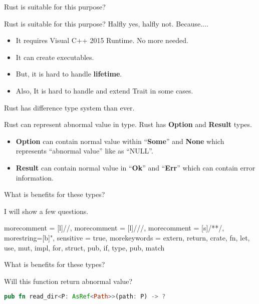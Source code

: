 \documentclass[12pt, unicode]{beamer}
\begin{document}
\begin{frame}{Rust is suitable for this purpose?}
\begin{block}{Rust is suitable for this purpose?}
Halfly yes, halfly not. Because....
\end{block}
\begin{itemize}
\item<2-> It requires Visual C++ 2015 Runtime. No more needed.
\item<3-> It can create executables.
\item<4-> But, it is hard to handle \textbf {lifetime}.
\item<5-> Also, It is hard to handle and extend Trait in some cases.
\end{itemize}
\end{frame}

\begin{frame}{Rust has difference type system than ever.}
\begin{block}{Rust can represent abnormal value in type.}
Rust has \textbf {Option} and \textbf{Result} types.
\end{block}
\begin{itemize}
\item<2-> \textbf {Option} can contain normal value within ``\textbf{Some}'' and \textbf{None} which represents ``abnormal value'' like as ``NULL''.
\item<3-> \textbf {Result} can contain normal value in ``\textbf{Ok}'' and ``\textbf{Err}'' which can contain error information.
\end{itemize}
\end{frame}

\begin{frame}{What is benefits for these types?}
  \begin{block}{}
    I will show a few questions.
  \end{block}
\end{frame}

\newcommand\Small{\fontsize{9}{9.2}\selectfont}
 {
  morecomment = [l]{//},
  morecomment = [l]{///},
  morecomment = [s]{/*}{*/},
  morestring=[b]",
  sensitive = true,
  morekeywords = {extern, return, crate, fn, let, use, mut, impl, for, struct, pub, if, type, pub, match}
}
\begin{frame}[fragile]{What is benefits for these types?}
  \begin{block}{}
    Will this function return abnormal value?
  \end{block}
  \begin{lstlisting}[language={Rust},basicstyle=\ttfamily\Small]
    pub fn read_dir<P: AsRef<Path>>(path: P) -> ?
  \end{lstlisting}
\end{frame}
\end{document}
